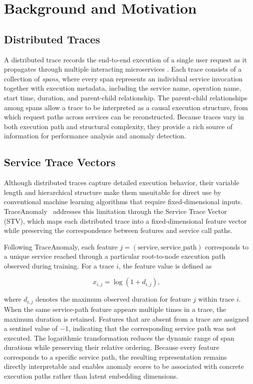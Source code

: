 \section{Background and Motivation}
\label{sec:background}

\subsection{Distributed Traces}

A distributed trace records the end-to-end execution of a single user
request as it propagates through multiple interacting microservices
\cite{sigelman2010dapper}. Each trace consists of a collection of
\emph{spans}, where every span represents an individual service
invocation together with execution metadata, including the service name,
operation name, start time, duration, and parent-child relationship. The
parent-child relationships among spans allow a trace to be interpreted as
a causal execution structure, from which request paths across services
can be reconstructed. Because traces vary in both execution path and
structural complexity, they provide a rich source of information for
performance analysis and anomaly detection.

\subsection{Service Trace Vectors}

Although distributed traces capture detailed execution behavior, their
variable length and hierarchical structure make them unsuitable for
direct use by conventional machine learning algorithms that require
fixed-dimensional inputs. TraceAnomaly~\cite{liu2020traceanomaly}
addresses this limitation through the Service Trace Vector (STV), which
maps each distributed trace into a fixed-dimensional feature vector while
preserving the correspondence between features and service call paths.

Following TraceAnomaly, each feature 
$j=(\mathrm{service},\mathrm{service\_path})$ corresponds to a unique service reached through a particular root-to-node execution path observed during training.
For a trace \(i\), the feature value is defined as

\begin{equation}
x_{i,j}=\log\!\left(1+d_{i,j}\right),
\label{eq:stv-value}
\end{equation}

where \(d_{i,j}\) denotes the maximum observed duration for feature \(j\)
within trace \(i\). When the same service-path feature appears multiple
times in a trace, the maximum duration is retained. Features that are
absent from a trace are assigned a sentinel value of \(-1\), indicating
that the corresponding service path was not executed. The logarithmic
transformation reduces the dynamic range of span durations while
preserving their relative ordering. Because every feature corresponds to
a specific service path, the resulting representation remains directly
interpretable and enables anomaly scores to be associated with concrete
execution paths rather than latent embedding dimensions.

